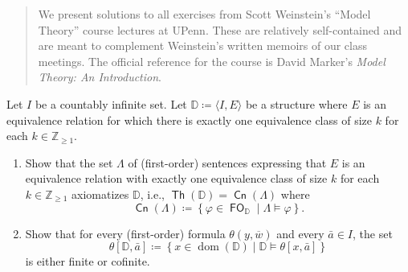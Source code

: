 \documentclass[10pt,letterpaper,cm]{nupset}
\theoremstyle{definition}
\theoremstyle{theorem}
\theoremstyle{remark}
\newcommand{\D}{\mathbb D}
\newcommand{\Z}{\mathbb Z}
\newcommand{\1}{\mathbb{1}}
\newcommand{\0}{\vec 0}
\DeclareMathOperator{\dom}{dom}
\DeclareMathOperator{\thh}{\mathsf{Th}}
\DeclareMathOperator{\cn}{\mathsf{Cn}}
\DeclareMathOperator{\fo}{\mathsf{FO}}
\newcommand{\be}{\begin{enumerate}}
\newcommand{\ee}{\end{enumerate}}
\begin{document}
\begin{abstract}
We present solutions to all exercises from Scott Weinstein's ``Model Theory'' course lectures at UPenn. These are relatively self-contained and are meant to complement Weinstein's written memoirs of our class meetings. The official reference for the course is David Marker's \textit{Model Theory: An Introduction}.
\end{abstract}

\begin{problem}[1.] 
Let $I$ be a countably infinite set. Let $\D \coloneqq \langle I, E\rangle$ be a structure where $E$ is an equivalence relation for which  there is exactly one equivalence class of size $k$ for each $k\in \Z_{\geq 1}$.
\be[label=(\arabic*)]
\item Show that the set $\Lambda$ of (first-order) sentences expressing that $E$ is an equivalence relation with exactly one equivalence class of size $k$ for each $k\in \Z_{\geq 1}$ axiomatizes $\D$, i.e., $\thh(\D) = \cn(\Lambda)$ where 
\[
\cn(\Lambda) \coloneqq  \left\{\varphi \in \fo_{\D} \mid \Lambda \models \varphi\right\}
.\]
\item Show that for every (first-order) formula $\theta(y, \overline{w})$ and every $\bar{a}\in I$, the set $$\theta\left[\D, \bar{a}\right] \coloneqq \left\{x\in \dom(\D) \mid \D\models \theta\left[x, \bar{a}\right]\right\}$$ is either finite or cofinite.
\ee
\end{problem}
\end{document}

